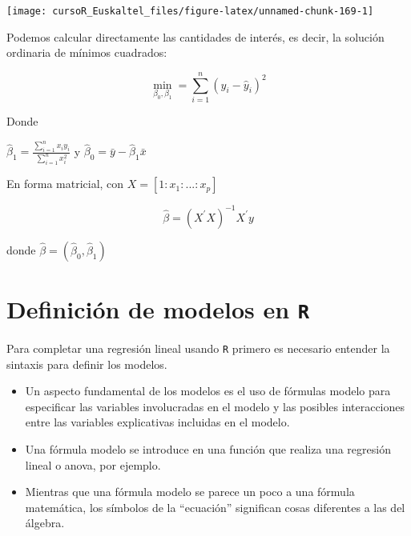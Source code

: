 \documentclass[]{book}
\begin{document}
\begin{center}\texttt{[image: cursoR\_Euskaltel\_files/figure-latex/unnamed-chunk-169-1]} \end{center}

Podemos calcular directamente las cantidades de interés, es decir, la
solución ordinaria de mínimos cuadrados:

\[
\min_{\beta_0,\beta_1} = \sum_{i=1}^{n} (y_i - \hat{y}_i)^2  
\]

Donde

\(\hat{\beta}_1 = \frac{\sum_{i=1}^{n}x_iy_i}{\sum_{i=1}^n x_i^2}\) y
\(\hat{\beta}_0 = \bar{y} - \hat{\beta}_1\bar{x}\)

En forma matricial, con \(X=[1:x_1:...:x_p]\)

\[
\hat{\beta}  = (X^\prime X)^{-1} X^\prime y
\]

donde \(\hat{\beta} = (\hat{\beta}_0,\hat{\beta}_1)\)

\section{\texorpdfstring{Definición de modelos en
\texttt{R}}{Definición de modelos en R}}\label{definicion-de-modelos-en-r}

Para completar una regresión lineal usando \texttt{R} primero es
necesario entender la sintaxis para definir los modelos.

\begin{itemize}
\item
  Un aspecto fundamental de los modelos es el uso de fórmulas modelo
  para especificar las variables involucradas en el modelo y las
  posibles interacciones entre las variables explicativas incluidas en
  el modelo.
\item
  Una fórmula modelo se introduce en una función que realiza una
  regresión lineal o anova, por ejemplo.
\item
  Mientras que una fórmula modelo se parece un poco a una fórmula
  matemática, los símbolos de la ``ecuación'' significan cosas
  diferentes a las del álgebra.
\end{itemize}
\end{document}
